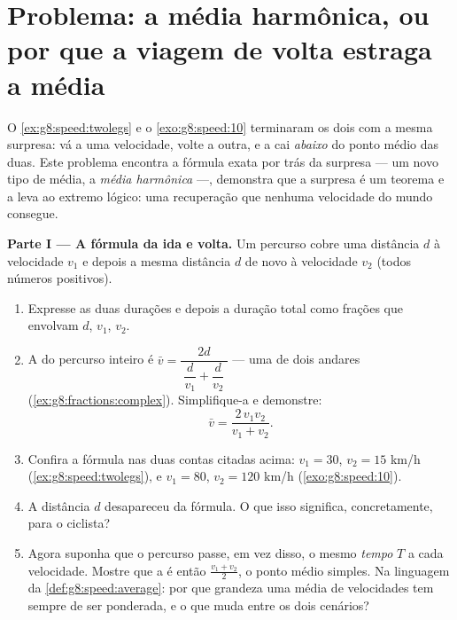 \section{Problema: a média harmônica, ou por que a viagem de volta
estraga a média}

\begin{problem}
\label{pb:g8:speed:1}
O \cref{ex:g8:speed:twolegs} e o \cref{exo:g8:speed:10} terminaram os
dois com a mesma surpresa: vá a uma velocidade, volte a outra, e a
 cai \emph{abaixo} do ponto médio das duas. Este
problema encontra a fórmula exata por trás da surpresa --- um novo tipo
de média, a \emph{média harmônica} ---,
demonstra que a surpresa é um teorema e a leva ao extremo lógico: uma
recuperação que nenhuma velocidade do mundo consegue.

\medskip
\noindent\textbf{Parte I --- A fórmula da ida e volta.}
Um percurso cobre uma distância $d$ à velocidade $v_1$ e depois a mesma
distância $d$ de novo à velocidade $v_2$ (todos números positivos).
\begin{enumerate}
  \item Expresse as duas durações e depois a duração total como
        frações que envolvam $d$, $v_1$, $v_2$.
  \item A  do percurso inteiro é
        $\bar v = \dfrac{2d}{\ \dfrac{d}{v_1} + \dfrac{d}{v_2}\ }$ ---
        uma  de dois andares
        (\cref{ex:g8:fractions:complex}). Simplifique-a e demonstre:
        \[
        \bar v = \frac{2\, v_1 v_2}{v_1 + v_2} .
        \]
  \item Confira a fórmula nas duas contas citadas acima: $v_1 = 30$,
        $v_2 = 15$ km/h (\cref{ex:g8:speed:twolegs}), e $v_1 = 80$,
        $v_2 = 120$ km/h (\cref{exo:g8:speed:10}).
  \item A distância $d$ desapareceu da fórmula. O que isso significa,
        concretamente, para o ciclista?
  \item Agora suponha que o percurso passe, em vez disso, o mesmo
        \emph{tempo} $T$ a cada velocidade. Mostre que a  é então $\frac{v_1 + v_2}{2}$, o ponto médio simples. Na
        linguagem da \cref{def:g8:speed:average}: por que grandeza uma
        média de velocidades tem sempre de ser ponderada, e o que muda
        entre os dois cenários?
\end{enumerate}


\end{problem}
